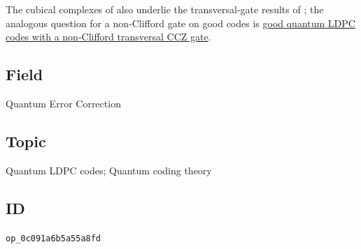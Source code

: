 The cubical complexes of  also underlie the
transversal-gate results of ; the analogous
question for a non-Clifford gate on good codes is
\href{https://qiqc-op.com/problem/op_15c6d5adf1796d86/}{good quantum LDPC codes
with a non-Clifford transversal CCZ gate}.

\subsection*{Field}

Quantum Error Correction

\subsection*{Topic}

Quantum LDPC codes; Quantum coding theory

\subsection*{ID}

\texttt{op\_0c091a6b5a55a8fd}
